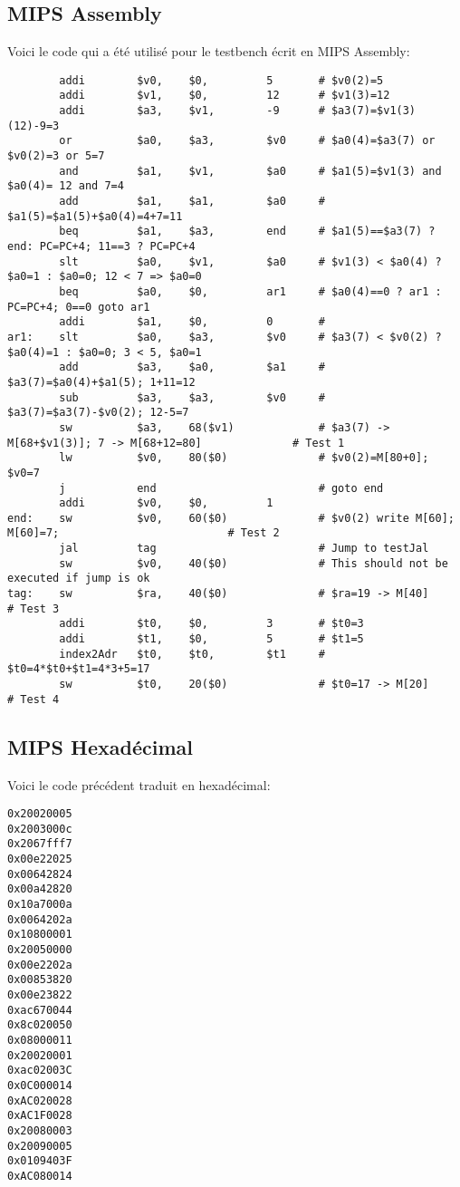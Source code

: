 \documentclass[12pt]{article}
\begin{document}
\subsection{MIPS Assembly}
Voici le code qui a été utilisé pour le testbench écrit en MIPS Assembly:
\singlespacing
\scriptsize
\begin{verbatim}
        addi        $v0,    $0,         5       # $v0(2)=5
        addi        $v1,    $0,         12      # $v1(3)=12
        addi        $a3,    $v1,        -9      # $a3(7)=$v1(3)(12)-9=3
        or          $a0,    $a3,        $v0     # $a0(4)=$a3(7) or $v0(2)=3 or 5=7
        and         $a1,    $v1,        $a0     # $a1(5)=$v1(3) and $a0(4)= 12 and 7=4
        add         $a1,    $a1,        $a0     # $a1(5)=$a1(5)+$a0(4)=4+7=11
        beq         $a1,    $a3,        end     # $a1(5)==$a3(7) ? end: PC=PC+4; 11==3 ? PC=PC+4
        slt         $a0,    $v1,        $a0     # $v1(3) < $a0(4) ? $a0=1 : $a0=0; 12 < 7 => $a0=0
        beq         $a0,    $0,         ar1     # $a0(4)==0 ? ar1 : PC=PC+4; 0==0 goto ar1
        addi        $a1,    $0,         0       #
ar1:    slt         $a0,    $a3,        $v0     # $a3(7) < $v0(2) ? $a0(4)=1 : $a0=0; 3 < 5, $a0=1
        add         $a3,    $a0,        $a1     # $a3(7)=$a0(4)+$a1(5); 1+11=12
        sub         $a3,    $a3,        $v0     # $a3(7)=$a3(7)-$v0(2); 12-5=7
        sw          $a3,    68($v1)             # $a3(7) -> M[68+$v1(3)]; 7 -> M[68+12=80]              # Test 1
        lw          $v0,    80($0)              # $v0(2)=M[80+0]; $v0=7
        j           end                         # goto end
        addi        $v0,    $0,         1
end:    sw          $v0,    60($0)              # $v0(2) write M[60]; M[60]=7;                          # Test 2
        jal         tag                         # Jump to testJal
        sw          $v0,    40($0)              # This should not be executed if jump is ok
tag:    sw          $ra,    40($0)              # $ra=19 -> M[40]                                       # Test 3
        addi        $t0,    $0,         3       # $t0=3
        addi        $t1,    $0,         5       # $t1=5
        index2Adr   $t0,    $t0,        $t1     # $t0=4*$t0+$t1=4*3+5=17
        sw          $t0,    20($0)              # $t0=17 -> M[20]                                       # Test 4
\end{verbatim}
\normalsize
\doublespacing

\pagebreak
\subsection{MIPS Hexadécimal}
Voici le code précédent traduit en hexadécimal:
\singlespacing
\begin{verbatim}
0x20020005
0x2003000c
0x2067fff7
0x00e22025
0x00642824
0x00a42820
0x10a7000a
0x0064202a
0x10800001
0x20050000
0x00e2202a
0x00853820
0x00e23822
0xac670044
0x8c020050
0x08000011
0x20020001
0xac02003C
0x0C000014
0xAC020028
0xAC1F0028
0x20080003
0x20090005
0x0109403F
0xAC080014
\end{verbatim}
\doublespacing
\end{document}
